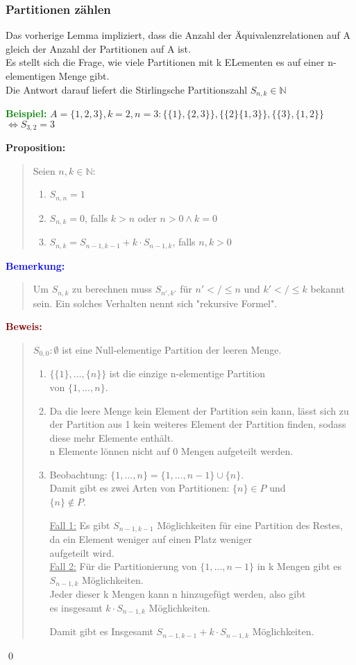 \documentclass{article}
\newcommand{\blue}[1]{\textcolor{blue}{#1}}
\newcommand{\green}[1]{\textcolor{green}{#1}}
\newcommand{\dgr}[1]{\textcolor{dgr}{#1}}
\newcommand{\maroon}[1]{\textcolor{maroon}{#1}}
\newcommand{\ex}{\green{\textbf{Beispiel: }}}
\newcommand{\an}[1]{\blue{\textbf{Bemerkung: }}\begin{quote}#1\end{quote}}
\newcommand{\prop}[1]{\dgr{\textbf{Proposition: }}\begin{quote}#1\end{quote}}
\newcommand{\pr}[1]{\maroon{\textbf{Beweis: }}\begin{quote}#1\end{quote}\qed}
\newcommand{\N}{\mathbb{N}}
\begin{document}
\subsubsection{Partitionen zählen}

Das vorherige Lemma impliziert, dass die Anzahl der Äquivalenzrelationen auf A gleich der Anzahl der Partitionen auf A ist.\\
Es stellt sich die Frage, wie viele Partitionen mit k ELementen es auf einer n-elementigen Menge gibt.\\
Die Antwort darauf liefert die Stirlingsche Partitionszahl $S_{n,k} \in \N$

\ex $A = \{1,2,3\}, k = 2, n = 3: \{\{1\},\{2,3\}\}, \{\{2\}\{1,3\}\}, \{\{3\}, \{1,2\}\}$\\
\phantom{\ex} $\iff S_{3,2} = 3$

\prop{
    Seien $n,k \in \N$:
    \begin{enumerate}
        \item $S_{n,n} = 1$
        \item $S_{n,k} = 0$, falls $k > n$ oder $n > 0 \land k = 0$
        \item $S_{n,k} = S_{n-1,k-1} + k \cdot S_{n-1, k}$, falls $n,k > 0$
    \end{enumerate}
}

\an{
    Um $S_{n,k}$ zu berechnen muss $S_{n',k'}$ für $n' < / \le n$ und $k' < / \le k$ bekannt sein. Ein solches Verhalten nennt sich "rekursive Formel".
}

\pr{
    $S_{0,0}: \emptyset$ ist eine Null-elementige Partition der leeren Menge.
    \begin{enumerate}
        \item $\{\{1\}, \dots, \{n\}\}$ ist die einzige n-elementige Partition\\
        von $\{1, \dots, n\}$.
        \item Da die leere Menge kein Element der Partition sein kann, lässt sich zu der Partition aus 1 kein weiteres Element der Partition finden, sodass diese mehr Elemente enthält.\\
        n Elemente lönnen nicht auf 0 Mengen aufgeteilt werden.
        \item Beobachtung: $\{1, \dots, n\} = \{1, \dots, n-1\} \cup \{n\}$.\\
        Damit gibt es zwei Arten von Partitionen: $\{n\} \in P$ und\\
        $\{n\} \notin P$.

        \underline{Fall 1:} Es gibt $S_{n-1,k-1}$ Möglichkeiten für eine Partition des Restes, da ein Element weniger auf einen Platz weniger\\
        aufgeteilt wird.\\
        \underline{Fall 2:} Für die Partitionierung von $\{1, \dots, n-1\}$ in k Mengen gibt es $S_{n-1,k}$ Möglichkeiten.\\
        Jeder dieser k Mengen kann n hinzugefügt werden, also gibt\\
        es insgesamt $k \cdot S_{n-1, k}$ Möglichkeiten.

        Damit gibt es Insgesamt $S_{n-1,k-1} + k \cdot S_{n-1,k}$ Möglichkeiten.
    \end{enumerate}
}
\end{document}
